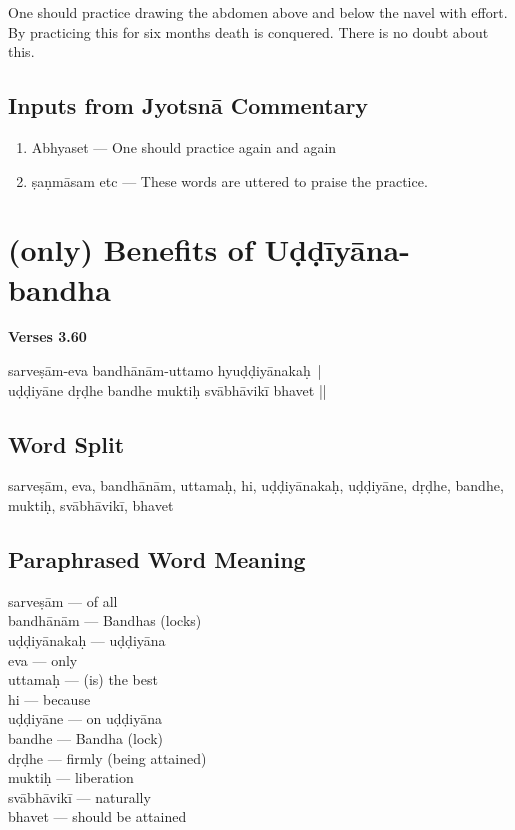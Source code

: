 One should practice drawing the abdomen above and below the navel with effort. By practicing this for six months death is conquered. There is no doubt about this. 

\subsection*{Inputs from Jyotsnā Commentary}

\begin{enumerate}
\item Abhyaset --- One should practice again and again 
\item ṣaṇmāsam etc ---  These words are uttered to praise the practice. 
\end{enumerate}

\section*{(only) Benefits of Uḍḍīyāna-bandha}

\noindent \textbf{Verses 3.60}

\begin{shloka}
sarveṣām-eva bandhānām-uttamo hyuḍḍiyānakaḥ |\\
uḍḍiyāne dṛḍhe bandhe muktiḥ svābhāvikī bhavet ||
\end{shloka}

\subsection*{Word Split}

sarveṣām, eva, bandhānām, uttamaḥ, hi, uḍḍiyānakaḥ, uḍḍiyāne, dṛḍhe, bandhe, muktiḥ, svābhāvikī, bhavet 
\newpage

\subsection*{Paraphrased Word Meaning}

\begin{multicols}{2}
sarveṣām --- of all\\
bandhānām --- Bandhas (locks)\\
uḍḍiyānakaḥ --- uḍḍiyāna\\
eva --- only \\
uttamaḥ --- (is) the best \\
hi --- because \\
uḍḍiyāne --- on uḍḍiyāna\\
bandhe --- Bandha (lock)\\
dṛḍhe --- firmly (being attained)\\
muktiḥ --- liberation \\
svābhāvikī ---  naturally \\
bhavet --- should be attained
\end{multicols}

